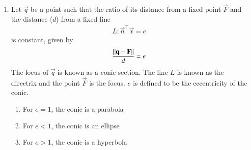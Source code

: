 \begin{enumerate}[label=\thesubsection.\arabic*.,ref=\thesubsection.\theenumi]
\item
  Let $\vec{q}$ be a point such that the ratio of its distance from a fixed point $\vec{F}$ and the distance ($d$) from a fixed line 
	\begin{align}
L: \vec{n}^{\top}\vec{x}=c 
	\end{align}
		is constant, given by 
\label{conics/30/def}
\begin{align}
\frac{\left\lVert\mathbf{q}-\mathbf{F}\right\rVert}{d} = e    
\end{align}
The locus of $\vec{q}$ is known as a conic section. The line $L$ is known as the directrix and the point $\vec{F}$ is the focus. $e$ is defined to be 
the eccentricity of the conic.  
\begin{enumerate}
    \item For $e = 1$, the conic is a parabola
    \item For $e < 1$, the conic is an ellipse
    \item For $e > 1$, the conic is a hyperbola
\end{enumerate}


\end{enumerate}
